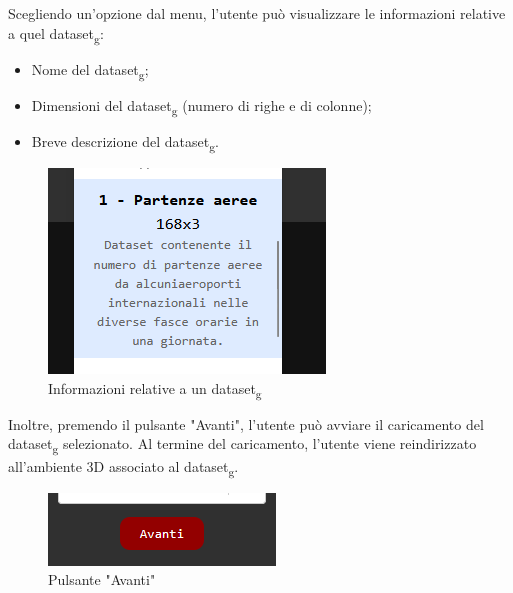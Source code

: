 Scegliendo un'opzione dal menu, l'utente può visualizzare le informazioni
relative a quel dataset\textsubscript{g}:
\begin{itemize}
    \item Nome del dataset\textsubscript{g};
    \item Dimensioni del dataset\textsubscript{g} (numero di righe e di colonne);
    \item Breve descrizione del dataset\textsubscript{g}.
\end{itemize}
\begin{figure}[ht!]
    \centering
    \includegraphics[scale=0.5]{template/images/home/dataset.png}
    \caption{Informazioni relative a un dataset\textsubscript{g}}
\end{figure}
Inoltre, premendo il pulsante "Avanti", l'utente può avviare il caricamento del
dataset\textsubscript{g} selezionato. Al termine del caricamento, l'utente viene reindirizzato
all'ambiente 3D associato al dataset\textsubscript{g}.
\begin{figure}[ht!]
    \centering
    \includegraphics[scale=0.6]{template/images/home/btn.png}
    \caption{Pulsante "Avanti"}
\end{figure}

